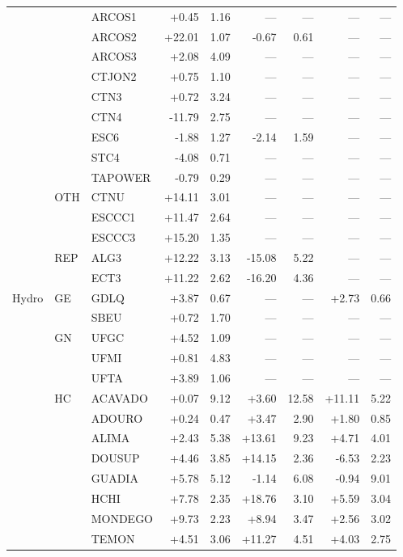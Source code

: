 \begin{tabular}{l l l r r r r r r}
 &  & ARCOS1 & +0.45 & 1.16 & --- & --- & --- & --- \\
 &  & ARCOS2 & +22.01 & 1.07 & -0.67 & 0.61 & --- & --- \\
 &  & ARCOS3 & +2.08 & 4.09 & --- & --- & --- & --- \\
 &  & CTJON2 & +0.75 & 1.10 & --- & --- & --- & --- \\
 &  & CTN3 & +0.72 & 3.24 & --- & --- & --- & --- \\
 &  & CTN4 & -11.79 & 2.75 & --- & --- & --- & --- \\
 &  & ESC6 & -1.88 & 1.27 & -2.14 & 1.59 & --- & --- \\
 &  & STC4 & -4.08 & 0.71 & --- & --- & --- & --- \\
 &  & TAPOWER & -0.79 & 0.29 & --- & --- & --- & --- \\
 & OTH & CTNU & +14.11 & 3.01 & --- & --- & --- & --- \\
 &  & ESCCC1 & +11.47 & 2.64 & --- & --- & --- & --- \\
 &  & ESCCC3 & +15.20 & 1.35 & --- & --- & --- & --- \\
 & REP & ALG3 & +12.22 & 3.13 & -15.08 & 5.22 & --- & --- \\
 &  & ECT3 & +11.22 & 2.62 & -16.20 & 4.36 & --- & --- \\
\addlinespace
Hydro & GE & GDLQ & +3.87 & 0.67 & --- & --- & +2.73 & 0.66 \\
 &  & SBEU & +0.72 & 1.70 & --- & --- & --- & --- \\
 & GN & UFGC & +4.52 & 1.09 & --- & --- & --- & --- \\
 &  & UFMI & +0.81 & 4.83 & --- & --- & --- & --- \\
 &  & UFTA & +3.89 & 1.06 & --- & --- & --- & --- \\
 & HC & ACAVADO & +0.07 & 9.12 & +3.60 & 12.58 & +11.11 & 5.22 \\
 &  & ADOURO & +0.24 & 0.47 & +3.47 & 2.90 & +1.80 & 0.85 \\
 &  & ALIMA & +2.43 & 5.38 & +13.61 & 9.23 & +4.71 & 4.01 \\
 &  & DOUSUP & +4.46 & 3.85 & +14.15 & 2.36 & -6.53 & 2.23 \\
 &  & GUADIA & +5.78 & 5.12 & -1.14 & 6.08 & -0.94 & 9.01 \\
 &  & HCHI & +7.78 & 2.35 & +18.76 & 3.10 & +5.59 & 3.04 \\
 &  & MONDEGO & +9.73 & 2.23 & +8.94 & 3.47 & +2.56 & 3.02 \\
 &  & TEMON & +4.51 & 3.06 & +11.27 & 4.51 & +4.03 & 2.75 \\

\end{tabular}
